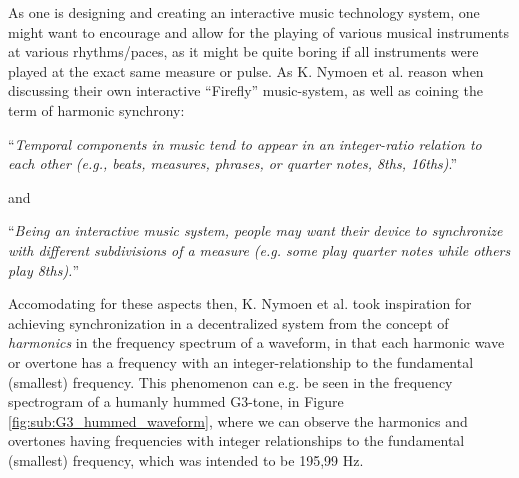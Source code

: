 As one is designing and creating an interactive music technology system, one might want to encourage and allow for the playing of various musical instruments at various rhythms/paces, as it might be quite boring if all instruments were played at the exact same measure or pulse. As K. Nymoen et al. \cite{nymoen_synch} reason when discussing their own interactive ``Firefly'' music-system, as well as coining the term of harmonic synchrony: \nl

``\textit{Temporal components in music tend to appear in an integer-ratio relation to each other (e.g., beats, measures, phrases, or quarter notes, 8ths, 16ths)}.'' \nl

and \nl

``\textit{Being an interactive music system, people may want their device to synchronize with different subdivisions of a measure (e.g. some play quarter notes while others play 8ths).}'' \nl

Accomodating for these aspects then, K. Nymoen et al. \cite{nymoen_synch} took inspiration for achieving synchronization in a decentralized system from the concept of \textit{harmonics} in the frequency spectrum of a waveform, in that each harmonic wave or overtone has a frequency with an integer-relationship to the fundamental (smallest) frequency. This phenomenon can e.g. be seen in the frequency spectrogram of a humanly hummed G3-tone, in Figure \ref{fig:sub:G3_hummed_waveform}, where we can observe the harmonics and overtones having frequencies with integer relationships to the fundamental (smallest) frequency, which was intended to be 195,99 Hz.


